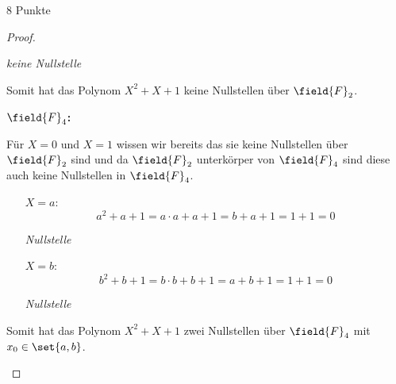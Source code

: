 \documentclass{../problemset}
\begin{document}
\begin{problem}{8 Punkte}
\begin{proof}
\begin{enumerate}
\begin{itemize}
			            \textit{keine Nullstelle}

		      \end{itemize}

		      Somit hat das Polynom $X^2 + X + 1$ keine Nullstellen über $\field{F}_2$.

		      \textbf{$\field{F}_4$:}

		      Für $X = 0$ und $X = 1$ wissen wir bereits das sie keine Nullstellen über $\field{F}_2$ sind und da $\field{F}_2$ unterkörper von $\field{F}_4$ sind diese auch keine Nullstellen in $\field{F}_4$.
		      \begin{itemize}
			      \item [$X = a$:]
			            \[
				            a^2 + a + 1 = a \cdot a + a + 1 = b + a + 1 = 1 + 1 = 0
			            \]

			            \textit{Nullstelle} \checkmark

			      \item [$X = b$:]
			            \[
				            b^2 + b + 1 = b \cdot b + b + 1 = a + b + 1 = 1 + 1 = 0
			            \]

			            \textit{Nullstelle} \checkmark

		      \end{itemize}

		      Somit hat das Polynom $X^2 + X + 1$ zwei Nullstellen über $\field{F}_4$ mit $x_0 \in \set{a,b}$.
	\end{enumerate}
\end{proof}
\end{problem}
\end{document}
